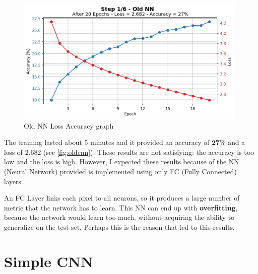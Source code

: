 \documentclass[a4paper, 11pt]{article}
\begin{document}
		\begin{figure}[ht!]
			\centering
			\includegraphics[width=0.65\paperwidth]{img/fig01.png}
			\caption{Old NN Loss Accuracy graph}
			\label{fig:oldcnn}
		\end{figure}
	
	The training lasted about 5 minutes and it provided an accuracy of $\boldsymbol{27\%}$ and a loss of $\boldsymbol{2.682}$ (see \vref{fig:oldcnn}). These results are not satisfying: the accuracy is too low and the loss is high. However, I expected these results because of the NN (Neural Network) provided is implemented using only FC (Fully Connected) layers.
	
	An FC Layer links each pixel to all neurons, so it produces a large number of metric that the network has to learn. This NN can end up with \textbf{overfitting}, because the network would learn too much, without acquiring the ability to generalize on the test set. Perhaps this is the reason that led to this results.
	
	\section{Simple CNN} \label{sect2}
	
\end{document}
